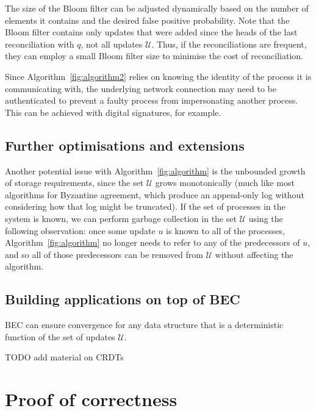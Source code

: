 \documentclass[a4paper,anonymous,USenglish]{lipics-v2019}
\begin{document}
The size of the Bloom filter can be adjusted dynamically based on the number of elements it contains and the desired false positive probability.
Note that the Bloom filter contains only updates that were added since the heads of the last reconciliation with $q$, not all updates $\mathcal{U}$.
Thus, if the reconciliations are frequent, they can employ a small Bloom filter size to minimise the cost of reconciliation.

Since Algorithm~\ref{fig:algorithm2} relies on knowing the identity of the process it is communicating with, the underlying network connection may need to be authenticated to prevent a faulty process from impersonating another process.
This can be achieved with digital signatures, for example.

\subsection{Further optimisations and extensions}\label{sec:optimisations}

Another potential issue with Algorithm~\ref{fig:algorithm} is the unbounded growth of storage requirements, since the set $\mathcal{U}$ grows monotonically (much like most algorithms for Byzantine agreement, which produce an append-only log without considering how that log might be truncated).
If the set of processes in the system is known, we can perform garbage collection in the set $\mathcal{U}$ using the following observation: once some update $u$ is known to all of the processes, Algorithm~\ref{fig:algorithm} no longer needs to refer to any of the predecessors of $u$, and so all of those predecessors can be removed from $\mathcal{U}$ without affecting the algorithm.


\subsection{Building applications on top of BEC}\label{sec:applications}

BEC can ensure convergence for any data structure that is a deterministic function of the set of updates $\mathcal{U}$.

TODO add material on CRDTs

\section{Proof of correctness}\label{sec:proof}
\end{document}
